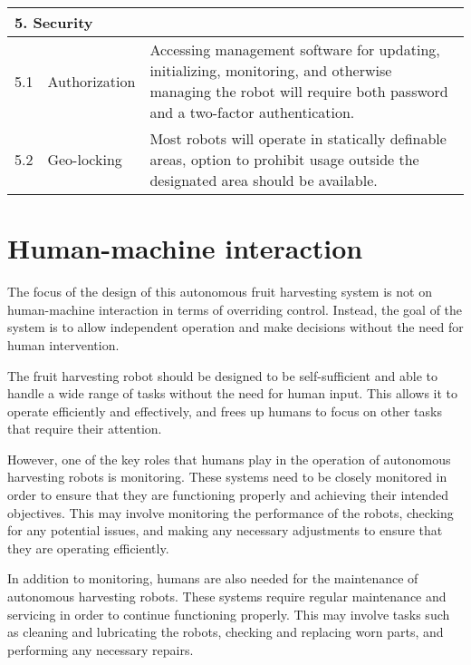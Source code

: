 \documentclass[%
oneside,    %
project,    %
nosummary   %
]{USN-MSc}
\begin{document}
\begin{longtable}{| m{1.5cm} | m{3cm} | m{10cm} |}
  \multicolumn{3}{|l|}{5. Security}                                                                                                                                                                                                           \\ \hline
  5.1
   & Authorization
   & Accessing management software for updating, initializing, monitoring, and otherwise managing the robot will require both password and a two-factor authentication.                                                                       \\ \hline
  5.2
   & Geo-locking
   & Most robots will operate in statically definable areas, option to prohibit usage outside the designated area should be available.                                                                                                        \\ \hline
\end{longtable}

\section{Human-machine interaction}
The focus of the design of this autonomous fruit harvesting system is not on human-machine interaction in terms of overriding control. Instead, the goal of the system is to allow independent operation and make decisions without the need for human intervention.

The fruit harvesting robot should be designed to be self-sufficient and able to handle a wide range of tasks without the need for human input. This allows it to operate efficiently and effectively, and frees up humans to focus on other tasks that require their attention.

However, one of the key roles that humans play in the operation of autonomous harvesting robots is monitoring. These systems need to be closely monitored in order to ensure that they are functioning properly and achieving their intended objectives. This may involve monitoring the performance of the robots, checking for any potential issues, and making any necessary adjustments to ensure that they are operating efficiently.

In addition to monitoring, humans are also needed for the maintenance of autonomous harvesting robots. These systems require regular maintenance and servicing in order to continue functioning properly. This may involve tasks such as cleaning and lubricating the robots, checking and replacing worn parts, and performing any necessary repairs.
\end{document}
